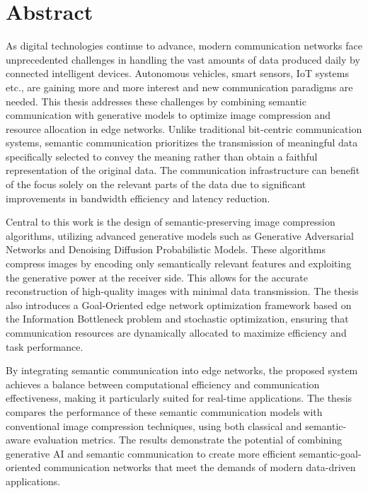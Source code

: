 \thispagestyle{plain}			%
\setlength{\parskip}{0pt plus 1.0pt}
\section*{Abstract}
As digital technologies continue to advance, modern communication networks face unprecedented challenges in handling the vast amounts of data produced daily by connected intelligent devices. Autonomous vehicles, smart sensors, IoT systems etc., are gaining more and more interest and new communication paradigms are needed. This thesis addresses these challenges by combining semantic communication with generative models to optimize image compression and resource allocation in edge networks. Unlike traditional bit-centric communication systems, semantic communication prioritizes the transmission of meaningful data specifically selected to convey the meaning rather than obtain a faithful representation of the original data. The communication infrastructure can benefit of the focus solely on the relevant parts of the data due to significant improvements in  bandwidth efficiency and latency reduction.

Central to this work is the design of semantic-preserving image compression algorithms, utilizing advanced generative models such as Generative Adversarial Networks and Denoising Diffusion Probabilistic Models. These algorithms compress images by encoding only semantically relevant features and exploiting the generative power at the receiver side. This allows for the accurate reconstruction of high-quality images with minimal data transmission. The thesis also introduces a Goal-Oriented edge network optimization framework based on the Information Bottleneck problem and stochastic optimization, ensuring that communication resources are dynamically allocated to maximize efficiency and task performance.

By integrating semantic communication into edge networks, the proposed system achieves a balance between computational efficiency and communication effectiveness, making it particularly suited for real-time applications. The thesis compares the performance of these semantic communication models with conventional image compression techniques, using both classical and semantic-aware evaluation metrics. The results demonstrate the potential of combining generative AI and semantic communication to create more efficient semantic-goal-oriented communication networks that meet the demands of modern data-driven applications.



